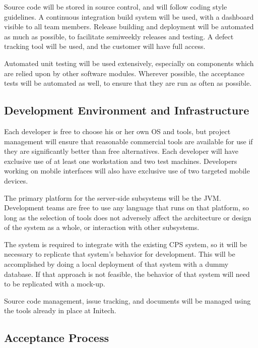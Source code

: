\documentclass[11pt]{article}
\begin{document}
Source code will be stored in source control, and will follow coding style guidelines.  A continuous
integration build system will be used, with a dashboard visible to all team members.  Release
building and deployment will be automated as much as possible, to facilitate semiweekly releases and
testing.  A defect tracking tool will be used, and the customer will have full access.

Automated unit testing will be used extensively, especially on components which are relied upon by
other software modules.  Wherever possible, the acceptance tests will be automated as well, to
ensure that they are run as often as possible.



\subsection{Development Environment and Infrastructure}
Each developer is free to choose his or her own OS and tools, but project management will ensure
that reasonable commercial tools are available for use if they are significantly better than free
alternatives.  Each developer will have exclusive use of at least one workstation and two test
machines.  Developers working on mobile interfaces will also have exclusive use of two targeted
mobile devices.

The primary platform for the server-side subsystems will be the JVM.  Development teams are free to
use any language that runs on that platform, so long as the selection of tools does not adversely
affect the architecture or design of the system as a whole, or interaction with other subsystems.

The system is required to integrate with the existing CPS system, so it will be necessary to
replicate that system's behavior for development.  This will be accomplished by doing a local
deployment of that system with a dummy database.  If that approach is not feasible, the behavior of
that system will need to be replicated with a mock-up.

Source code management, issue tracking, and documents will be managed using the tools already in
place at Initech.


\subsection{Acceptance Process}
\end{document}
